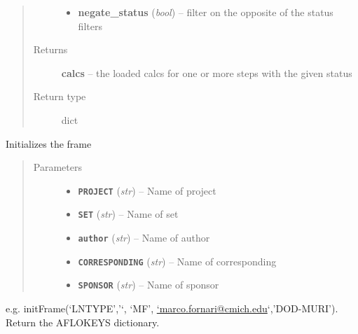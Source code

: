 \documentclass[letterpaper,10pt,english]{sphinxmanual}
\begin{document}
\begin{fulllineitems}
\begin{fulllineitems}
\begin{quote}
\begin{description}
\begin{itemize}
\item {} 
\textbf{negate\_status} (\emph{bool}) --
filter on the opposite of the status filters

\end{itemize}

\item[{Returns}] \leavevmode
\textbf{calcs} --
the loaded calcs for one or more steps with the given status

\item[{Return type}] \leavevmode
dict

\end{description}\end{quote}

\end{fulllineitems}


\begin{fulllineitems}
\label{prep:prep.init.values}
\end{fulllineitems}


\end{fulllineitems}


\begin{fulllineitems}
\label{prep:prep.init__}
Initializes the frame
\begin{quote}\begin{description}
\item[{Parameters}] \leavevmode\begin{itemize}
\item {} 
\textbf{\texttt{PROJECT}} (\emph{str}) -- Name of project

\item {} 
\textbf{\texttt{SET}} (\emph{str}) -- Name of set

\item {} 
\textbf{\texttt{author}} (\emph{str}) -- Name of author

\item {} 
\textbf{\texttt{CORRESPONDING}} (\emph{str}) -- Name of corresponding

\item {} 
\textbf{\texttt{SPONSOR}} (\emph{str}) -- Name of sponsor

\end{itemize}

\end{description}\end{quote}

e.g. initFrame(`LNTYPE','`, `MF', \href{mailto:'marco.fornari@cmich.edu}{`marco.fornari@cmich.edu}`,'DOD-MURI'). Return the AFLOKEYS dictionary.

\end{fulllineitems}
\end{document}
